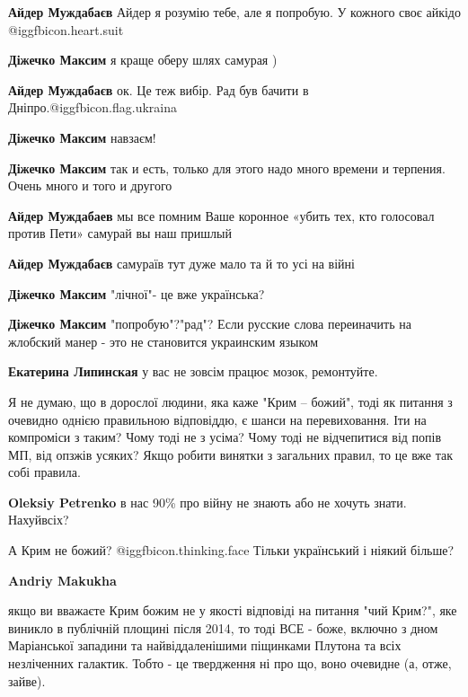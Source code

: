 \begin{itemize}
\begin{itemize}

\textbf{Айдер Муждабаєв} Айдер я розумію тебе, але я попробую. У кожного своє айкідо  @igg{fbicon.heart.suit}


\textbf{Діжечко Максим} я краще оберу шлях самурая )


\textbf{Айдер Муждабаєв} ок. Це теж вибір. Рад був бачити в Дніпро.@igg{fbicon.flag.ukraina}

\textbf{Діжечко Максим} навзаєм!

\textbf{Діжечко Максим} так и есть, только для этого надо много времени и терпения. Очень много и того и другого

\textbf{Айдер Муждабаев} мы все помним Ваше коронное «убить тех, кто голосовал против Пети» самурай вы наш пришлый

\textbf{Айдер Муждабаєв} самураїв тут дуже мало та й то усі на війні

\textbf{Діжечко Максим} "лічної"- це вже українська?

\textbf{Діжечко Максим} "попробую"?"рад"?
Если русские слова переиначить на жлобский манер - это не становится украинским языком

\textbf{Екатерина Липинская} у вас не зовсім працює мозок, ремонтуйте.
\end{itemize} %


Я не думаю, що в дорослої людини, яка каже "Крим – божий", тоді як питання з
очевидно однією правильною відповіддю, є шанси на перевиховання. Іти на
компроміси з таким? Чому тоді не з усіма? Чому тоді не відчепитися від попів
МП, від опзжів усяких? Якщо робити винятки з загальних правил, то це вже так
собі правила.

\begin{itemize} %
\textbf{Oleksiy Petrenko} в нас 90\% про війну не знають або не хочуть знати. Нахуйвсіх?

А Крим не божий?  @igg{fbicon.thinking.face}  Тільки український і ніякий більше?

\textbf{Andriy Makukha} 

якщо ви вважаєте Крим божим не у якості відповіді на питання "чий Крим?", яке
виникло в публічній площині після 2014, то тоді ВСЕ - боже, включно з дном
Маріанської западини та найвіддаленішими піщинками Плутона та всіх незліченних
галактик. Тобто - це твердження ні про що, воно очевидне (а, отже, зайве).


\end{itemize}
\end{itemize}
